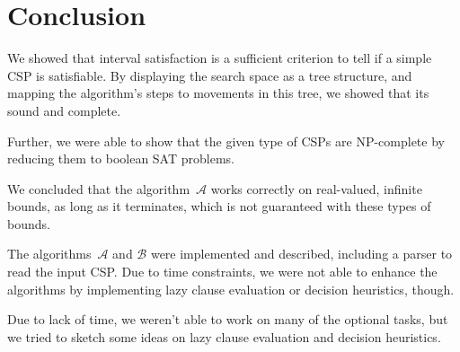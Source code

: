 \section{Conclusion}

We showed that interval satisfaction is a sufficient criterion to tell if a simple CSP is satisfiable.
By displaying the search space as a tree structure, and mapping the algorithm's steps to movements in this tree, we showed that its sound and complete.

Further, we were able to show that the given type of CSPs are NP-complete by reducing them to boolean SAT problems.

We concluded that the algorithm~$\mathcal{A}$ works correctly on real-valued, infinite bounds, as long as it terminates, which is not guaranteed with these types of bounds.

The algorithms~$\mathcal{A}$ and $\mathcal{B}$ were implemented and described, including a parser to read the input CSP. Due to time constraints, we were not able to enhance the algorithms by implementing lazy clause evaluation or decision heuristics, though.

Due to lack of time, we weren't able to work on many of the optional tasks, but we tried to sketch some ideas on lazy clause evaluation and decision heuristics.
